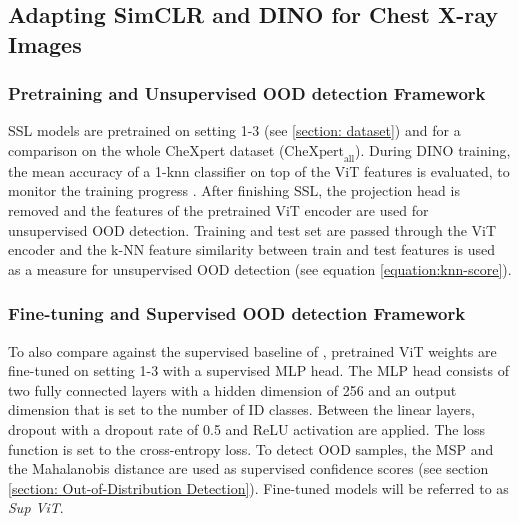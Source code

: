 \subsection{Adapting SimCLR and DINO for Chest X-ray Images}
\label{section: adapted-methods}
\subsubsection{Pretraining and Unsupervised OOD detection Framework}
SSL models are pretrained on setting 1-3 (see \ref{section: dataset}) and for a comparison on the whole CheXpert dataset ($\text{CheXpert}_\text{all}$).
During  DINO training, the mean accuracy of a 1-knn classifier on top of the ViT features is evaluated, to monitor the training progress \citep{Wu2018,Caron2021}.
After finishing SSL, the projection head is removed \citep{Caron2021,Chen2020} and the features of the pretrained ViT encoder are used for unsupervised OOD detection.
Training and test set are passed through the ViT encoder and the k-NN feature similarity between train and test features is used as a measure for unsupervised OOD detection (see equation \ref{equation:knn-score}).
\par
\subsubsection{Fine-tuning and Supervised OOD detection Framework}
To also compare against the supervised baseline of \citep{Berger2021}, pretrained ViT weights are fine-tuned on setting 1-3 with a supervised MLP head.
The MLP head consists of two fully connected layers with a hidden dimension of 256 and an output dimension that is set to the number of ID classes.
Between the linear layers, dropout with a dropout rate of 0.5 \citep{Srivastava2014} and ReLU activation \citep{Agarap2018} are applied.
The loss function is set to the cross-entropy loss. 
To detect OOD samples, the MSP and the Mahalanobis distance are used as supervised confidence scores (see section \ref{section: Out-of-Distribution Detection}).
Fine-tuned models will be referred to as \textit{Sup ViT}.
\par
